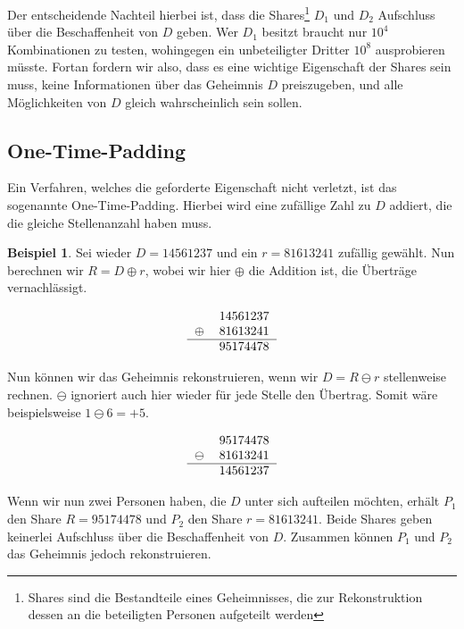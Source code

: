 \documentclass[12pt, a4paper, oneside, titlepage]{report}
\theoremstyle{definition}
\newtheorem{bsp}[lemma]{Beispiel}
\begin{document}
		Der entscheidende Nachteil hierbei ist, dass die Shares\footnote{Shares sind die Bestandteile eines Geheimnisses, die zur Rekonstruktion dessen an die beteiligten Personen aufgeteilt werden} $ D_1 $ und $ D_2 $ Aufschluss über die Beschaffenheit von $ D $ geben. Wer $ D_1 $ besitzt braucht nur $ 10^4 $ Kombinationen zu testen, wohingegen ein unbeteiligter Dritter $ 10^8 $ ausprobieren müsste. Fortan fordern wir also, dass es eine wichtige Eigenschaft der Shares sein muss, keine Informationen über das Geheimnis $ D $ preiszugeben, und alle Möglichkeiten von $ D $ gleich wahrscheinlich sein sollen.
		
	\subsection{One-Time-Padding}
		 Ein Verfahren, welches die geforderte Eigenschaft nicht verletzt, ist das sogenannte One-Time-Padding. Hierbei wird eine zufällige Zahl zu $ D $  addiert, die die gleiche Stellenanzahl haben muss.
		 
		 
	\begin{bsp}
		Sei wieder $ D = 14561237 $ und ein $ r = 81613241 $ zufällig gewählt. Nun berechnen wir $ R = D \oplus r $, wobei wir hier $ \oplus $ die Addition ist, die Überträge vernachlässigt.
		
	\begin{equation}
		\begin{tabular}{cr}
		  &14561237\\
		$\oplus$&81613241\\\hline
		  &95174478
		\end{tabular}
	\end{equation}
	
	Nun können wir das Geheimnis rekonstruieren, wenn wir $ D = R \ominus r $ stellenweise rechnen. $ \ominus $ ignoriert auch hier wieder für jede Stelle den Übertrag. Somit wäre beispielsweise $ 1 \ominus 6 = + 5 $.
	
	\begin{equation}
	\begin{tabular}{cr}
	&95174478\\
	$\ominus$&81613241\\\hline
	&14561237
	\end{tabular}
	\end{equation}
	
	Wenn wir nun zwei Personen haben, die $ D $ unter sich aufteilen möchten, erhält $ P_1 $ den Share $ R = 95174478 $ und $ P_2 $ den Share $ r = 81613241$. Beide Shares geben keinerlei Aufschluss über die Beschaffenheit von $ D $. Zusammen können $ P_1 $ und $ P_2 $ das Geheimnis jedoch rekonstruieren.
	\end{bsp}
\end{document}
